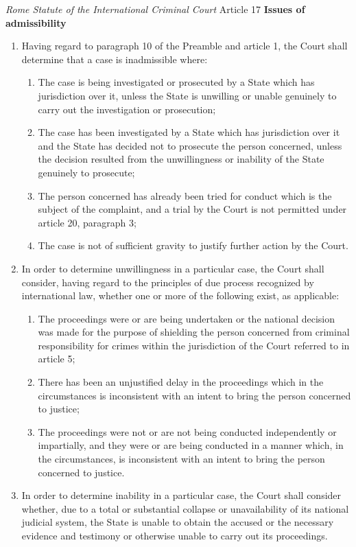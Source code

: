 \begin{statutedetails}{\textit{Rome Statute of the International Criminal Court} Article 17}
    \flushleft
    \textbf{Issues of admissibility}
    \begin{enumerate}
        \item Having regard to paragraph 10 of the Preamble and article 1, the Court shall determine that a case is inadmissible where:
        \begin{enumerate}[label=(\alph*)]
            \item The case is being investigated or prosecuted by a State which has jurisdiction over it, unless the State is unwilling or unable genuinely to carry out the investigation or prosecution; 
            \item The case has been investigated by a State which has jurisdiction over it and the State has decided not to prosecute the person concerned, unless the decision resulted from the unwillingness or inability of the State genuinely to prosecute; 
            \item The person concerned has already been tried for conduct which is the subject of the complaint, and a trial by the Court is not permitted under article 20, paragraph 3; 
            \item The case is not of sufficient gravity to justify further action by the Court.
        \end{enumerate}
        \item In order to determine unwillingness in a particular case, the Court shall consider, having regard to the principles of due process recognized by international law, whether one or more of the following exist, as applicable:
        \begin{enumerate}[label=(\alph*)]
            \item The proceedings were or are being undertaken or the national decision was made for the purpose of shielding the person concerned from criminal responsibility for crimes within the jurisdiction of the Court referred to in article 5; 
            \item There has been an unjustified delay in the proceedings which in the circumstances is inconsistent with an intent to bring the person concerned to justice; 
            \item The proceedings were not or are not being conducted independently or impartially, and they were or are being conducted in a manner which, in the circumstances, is inconsistent with an intent to bring the person concerned to justice.
        \end{enumerate}
        \item In order to determine inability in a particular case, the Court shall consider whether, due to a total or substantial collapse or unavailability of its national judicial system, the State is unable to obtain the accused or the necessary evidence and testimony or otherwise unable to carry out its proceedings.
    \end{enumerate}
\end{statutedetails}

